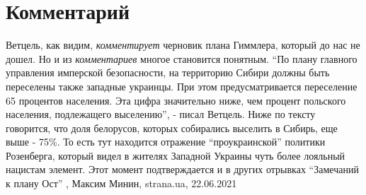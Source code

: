  
 
 
 
 
\chapter{Комментарий}
\label{sec:slova.kommentarij}

Ветцель, как видим, \emph{комментирует} черновик плана Гиммлера, который до нас
не дошел. Но и из \emph{комментариев} многое становится понятным. 
\enquote{По плану главного управления имперской безопасности, на территорию
Сибири должны быть переселены также западные украинцы. При этом
предусматривается переселение 65 процентов населения. Эта цифра значительно
ниже, чем процент польского населения, подлежащего выселению}, - писал Ветцель.
Ниже по тексту говорится, что доля белорусов, которых собирались выселить в
Сибирь, еще выше - 75\%. То есть тут находится отражение
\enquote{проукраинской} политики Розенберга, который видел в жителях Западной
Украины чуть более лояльный нацистам элемент.  Этот момент подтверждается и в
других отрывках \enquote{Замечаний к плану Ост}
  , Максим Минин, strana.ua, 22.06.2021
